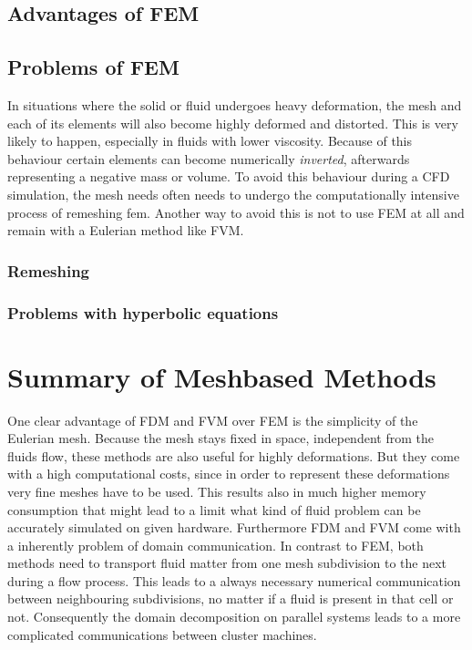 
\subsection{Advantages of FEM}
\label{sec:adv_of_fem}


\subsection{Problems of FEM}
In situations where the solid or fluid undergoes heavy deformation, the mesh and each of its elements will also become highly deformed and distorted. This is very likely to happen, especially in fluids with lower viscosity. Because of this behaviour certain elements can become numerically \emph{inverted}, afterwards representing a negative mass or volume. To avoid this behaviour during a CFD simulation, the mesh needs often needs to undergo the computationally intensive process of remeshing fem. Another way to avoid this is not to use FEM at all and remain with a Eulerian method like FVM. 

\subsubsection{Remeshing}
\label{sec:remeshing_fem}

\subsubsection{Problems with hyperbolic equations}

\section{Summary of Meshbased Methods}

One clear advantage of FDM and FVM over FEM is the simplicity of the Eulerian mesh.  Because the mesh stays fixed in space, independent from the fluids flow, these methods are also useful for highly deformations. But they come with a high computational costs, since in order to represent these deformations very fine meshes have to be used. This results also in much higher memory consumption that might lead to a limit what kind of fluid problem can be accurately simulated on given hardware. Furthermore FDM and FVM come with a inherently problem of domain communication. In contrast to FEM, both methods need to transport fluid matter from one mesh subdivision to the next during a flow process. This leads to a always necessary numerical communication between neighbouring subdivisions, no matter if a fluid is present in that cell or not. Consequently the domain decomposition on parallel systems leads to a more complicated communications between cluster machines.


